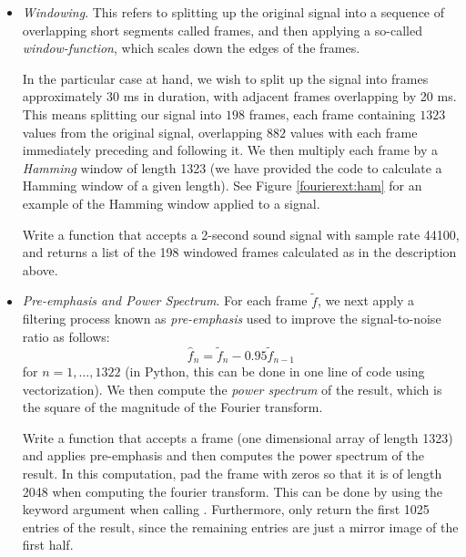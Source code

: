 \begin{itemize}
\item \emph{Windowing}. This refers to splitting up the original signal into a sequence of overlapping
short segments called frames, and then applying a so-called \emph{window-function}, which scales down
the edges of the frames.

In the particular case at hand, we wish to split up the signal into frames approximately 30 ms in
duration, with adjacent frames overlapping by 20 ms. This means splitting our signal into $198$ frames, 
each frame containing $1323$ values from the original signal, overlapping $882$ values with each frame 
immediately preceding and following it. We then multiply each frame by a \emph{Hamming} window of length
1323 (we have provided the code to calculate a Hamming window of a given length). See Figure 
\ref{fourierext:ham} for an example of the Hamming window applied to a signal.

\begin{problem}
Write a function  that accepts a 2-second sound signal with sample rate 44100, and
returns a list of the 198 windowed frames calculated as in the description above.
\end{problem}

\item \emph{Pre-emphasis and Power Spectrum}. For each frame $\tilde{f}$, we next apply
a filtering process known as \emph{pre-emphasis} used to improve the signal-to-noise ratio as follows:
\begin{equation*}
\widehat{f}_{n} = \tilde{f}_{n} - 0.95 \tilde{f}_{n-1}
\end{equation*}
for $n = 1,\ldots,1322$ (in Python, this can be done in one line of code using vectorization).
We then compute the \emph{power spectrum} of the result, which is the square of the magnitude of the
Fourier transform.

\begin{problem}
Write a function  that accepts a frame (one dimensional array of length 1323) and
applies pre-emphasis and then computes the power spectrum of the result. In this computation,
pad the frame with zeros so that it is of length 2048 when computing the fourier transform. This
can be done by using the keyword argument  when calling
. Furthermore, only return the first 1025 entries of the result,
since the remaining entries are just a mirror image of the first half.
\end{problem}


\end{itemize}
